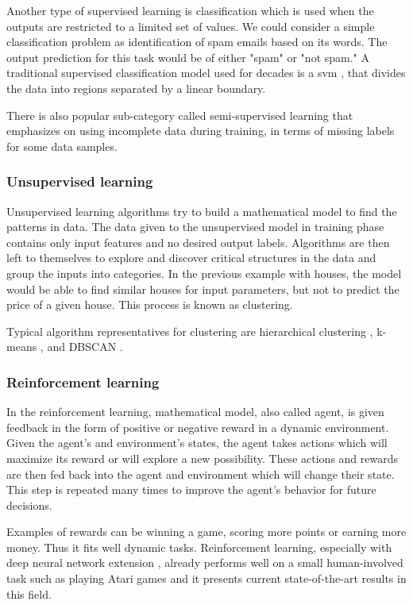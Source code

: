             Another type of supervised learning is classification which is used when the outputs are restricted to a limited set of values. We could consider a simple classification problem as identification of spam emails based on its words. The output prediction for this task would be of either "spam" or "not spam." A traditional supervised classification model used for decades is a \gls{svm} \cite{cortes1995support}, that divides the data into regions separated by a linear boundary. 
            
            There is also popular sub-category called semi-supervised learning that emphasizes on using incomplete data during training, in terms of missing labels for some data samples.
         
        \subsubsection{Unsupervised learning}
            Unsupervised learning algorithms try to build a mathematical model to find the patterns in data. The data given to the unsupervised model in training phase contains only input features and no desired output labels. Algorithms are then left to themselves to explore and discover critical structures in the data and group the inputs into categories. In the previous example with houses, the model would be able to find similar houses for input parameters, but not to predict the price of a given house. This process is known as clustering.
            
            Typical algorithm representatives for clustering are hierarchical clustering \cite{johnson1967hierarchical}, k-means \cite{macqueen1967some}, and DBSCAN \cite{ester1996density}.

            
        \subsubsection{Reinforcement learning}
            In the reinforcement learning, mathematical model, also called agent, is given feedback in the form of positive or negative reward in a dynamic environment. Given the agent's and environment's states, the agent takes actions which will maximize its reward or will explore a new possibility. These actions and rewards are then fed back into the agent and environment which will change their state. This step is repeated many times to improve the agent's behavior for future decisions. 
            
            Examples of rewards can be winning a game, scoring more points or earning more money. Thus it fits well dynamic tasks. Reinforcement learning, especially with deep neural network extension \cite{franccois2018introduction}, already performs well on a small human-involved task such as playing Atari games and it presents current state-of-the-art results in this field.
       
